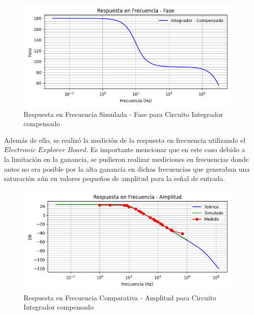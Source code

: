 \begin{figure}[H]
    \centering 
    \includegraphics [scale=0.6] {../Ejercicio3-CircuitoIntegradoresyDerivadores/Imagenes/diagrama-bode-integrador-simulado-compensado-fase.png} 
    \caption{Respuesta en Frecuencia Simulada - Fase para Circuito Integrador compensado }
    \label{fig:emptyPlotTool}
\end{figure}

Además de ello, se realizó la medición de la respuesta en frecuencia utilizando el $Electronic$ $Explorer$ $Board$. Es importante mencionar
que en este caso debido a la limitación en la ganancia, se pudieron realizar mediciones en frecuencias donde antes no era posible por la alta ganancia
en dichas frecuencias que generaban una saturación aún en valores pequeños de amplitud para la señal de entrada.

\begin{figure}[H]
    \centering 
    \includegraphics [scale=0.6] {../Ejercicio3-CircuitoIntegradoresyDerivadores/Imagenes/transferencia-comparativo-todo-amplitud.png} 
    \caption{Respuesta en Frecuencia Comparativa - Amplitud para Circuito Integrador compensado}
    \label{fig:emptyPlotTool}
\end{figure}

